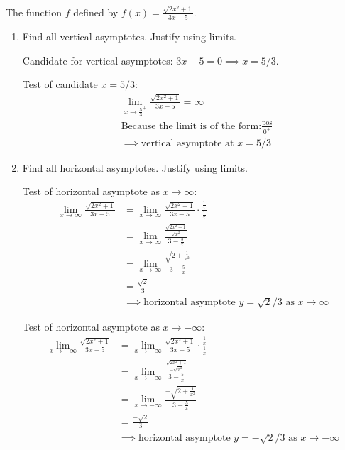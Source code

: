 \documentclass[nooutcomes]{ximera}
\begin{document}
\begin{problem}
The function $f$ defined by $\displaystyle f(x) = \frac{\sqrt{2x^2 + 1}}{3x-5}$.
  \begin{enumerate}
    \item
      Find all vertical asymptotes.  Justify using limits.
 \begin{freeResponse}
        Candidate for vertical asymptotes: $3x - 5 = 0 \implies x = 5/3$.

        Test of candidate $x = 5/3$:
        \begin{align*}
          &\lim_{x \to \frac{5}{3}^+} \frac{\sqrt{2x^2 + 1}}{3x-5} = \infty\\
	&\text{Because the limit is of the form:} \frac{\text{pos}}{0^+}\\
          &\implies \mbox{vertical asymptote at $x = 5/3$}
        \end{align*}

       \end{freeResponse}

    \item
      Find all horizontal asymptotes.  Justify using limits.
 

        \begin{freeResponse}
        Test of horizontal asymptote as $x \to \infty$:
        \begin{align*}
          \lim_{x \to \infty} \frac{\sqrt{2x^2 + 1}}{3x-5}
          &= \lim_{x \to \infty} \frac{\sqrt{2x^2 + 1}}{3x-5} \cdot \frac{\frac{1}{x}}{\frac{1}{x}} \\
          &= \lim_{x \to \infty}  \frac{\frac{\sqrt{2x^2 + 1}}{\sqrt{x^2}}}{3 - \frac{5}{x}}\\
          &= \lim_{x \to \infty}  \frac{\sqrt{2 + \frac{1}{x^2}}}{3 - \frac{5}{x}} \\
          &= \frac{\sqrt{2}}{3} \\
          &\implies \mbox{horizontal asymptote $y = \sqrt{2}/3$ as $x \to \infty$}
        \end{align*}

        Test of horizontal asymptote as $x \to -\infty$:
        \begin{align*}
          \lim_{x \to -\infty} \frac{\sqrt{2x^2 + 1}}{3x-5}
          &= \lim_{x \to -\infty} \frac{\sqrt{2x^2 + 1}}{3x-5} \cdot \frac{\frac{1}{x}}{\frac{1}{x}} \\
          &= \lim_{x \to -\infty}  \frac{\frac{\sqrt{2x^2 + 1}}{-\sqrt{x^2}}}{3 - \frac{5}{x}}\\
          &= \lim_{x \to -\infty}  \frac{-\sqrt{2 + \frac{1}{x^2}}}{3 - \frac{5}{x}} \\
          &= \frac{-\sqrt{2}}{3} \\
          &\implies \mbox{horizontal asymptote $y = -\sqrt{2}/3$ as $x \to -\infty$}
        \end{align*}
	
      \end{freeResponse}
 \end{enumerate}

    
\end{problem}
\end{document}
